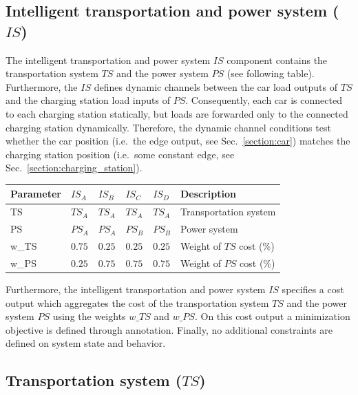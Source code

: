 \subsection{Intelligent transportation and power system ($IS$)}

The intelligent transportation and power system $IS$ component contains the transportation system $TS$ and the power system $PS$ (see following table). Furthermore, the $IS$ defines dynamic channels between the car load outputs of $TS$ and the charging station load inputs of $PS$. Consequently, each car is connected to each charging station statically, but loads are forwarded only to the connected charging station dynamically. Therefore, the dynamic channel conditions test whether the car position (i.e.\ the edge output, see Sec.~\ref{section:car}) matches the charging station position (i.e.\ some constant edge, see Sec.~\ref{section:charging_station}).

\begin{table}[h]
	\renewcommand{\arraystretch}{1.3}
	\centering
	\begin{tabularx}{\columnwidth}{lllllX}
		\hline
		\textbf{Parameter}      & \textbf{$IS_{A}$} & \textbf{$IS_{B}$}  & \textbf{$IS_{C}$} & \textbf{$IS_{D}$}      & \textbf{Description} \\ \hline
		TS     					& $TS_{A}$   	& $TS_{A}$ & $TS_{A}$ & $TS_{A}$	 	& Transportation system     			\\
		PS               		& $PS_{A}$ 	& $PS_{A}$ & $PS_{B}$ & $PS_{B}$		& Power system   						\\
		w\_TS              & $0.75$  	& $0.25$ & $0.25$ & $0.25$		& Weight of $TS$ cost (\%)	\\ 
		w\_PS              & $0.25$  	& $0.75$ & $0.75$ & $0.75$  		& Weight of $PS$ cost (\%)   			\\ \hline
	\end{tabularx}
\end{table}

Furthermore, the intelligent transportation and power system $IS$ specifies a cost output which aggregates the cost of the transportation system $TS$ and the power system $PS$ using the weights $w\_TS$ and $w\_PS$. On this cost output a minimization objective is defined through annotation. Finally, no additional constraints are defined on system state and behavior.

\subsection{Transportation system ($TS$)}


